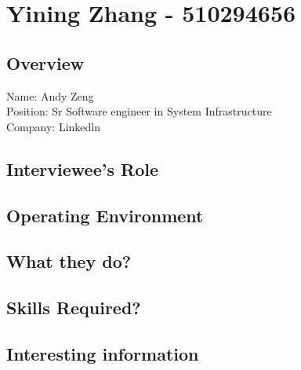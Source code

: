 \chapter{Yining Zhang - 510294656}

\section{Overview}
\noindent Name: Andy Zeng
\\
Position: Sr Software engineer in System Infrastructure
\\
Company: Linkedln

\section{Interviewee's Role}

\section{Operating Environment}

\section{What they do?}

\section{Skills Required?}

\section{Interesting information}

